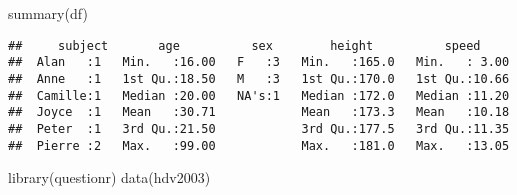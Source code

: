 \documentclass[
]{article}
\newenvironment{Shaded}{\begin{snugshade}}{\end{snugshade}}
\newcommand{\FunctionTok}[1]{\textcolor[rgb]{0.00,0.00,0.00}{#1}}
\newcommand{\NormalTok}[1]{#1}
\begin{document}
\begin{Shaded}
\begin{Highlighting}[]
\FunctionTok{summary}\NormalTok{(df)}
\end{Highlighting}
\end{Shaded}

\begin{verbatim}
##     subject       age          sex        height          speed      
##  Alan   :1   Min.   :16.00   F   :3   Min.   :165.0   Min.   : 3.00  
##  Anne   :1   1st Qu.:18.50   M   :3   1st Qu.:170.0   1st Qu.:10.66  
##  Camille:1   Median :20.00   NA's:1   Median :172.0   Median :11.20  
##  Joyce  :1   Mean   :30.71            Mean   :173.3   Mean   :10.18  
##  Peter  :1   3rd Qu.:21.50            3rd Qu.:177.5   3rd Qu.:11.35  
##  Pierre :2   Max.   :99.00            Max.   :181.0   Max.   :13.05
\end{verbatim}

\begin{Shaded}
\begin{Highlighting}[]
\FunctionTok{library}\NormalTok{(questionr)}
\FunctionTok{data}\NormalTok{(hdv2003)}
\end{Highlighting}
\end{Shaded}
\end{document}
